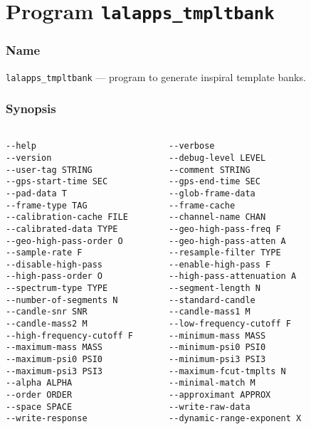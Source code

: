 \section{Program \texttt{lalapps\_tmpltbank}}
\label{program:lalapps-tmpltbank}

\subsubsection{Name}
\begin{entry}
\noindent\verb$lalapps_tmpltbank$ --- program to generate inspiral template banks.

\subsubsection{Synopsis}
\begin{verbatim}

--help                          --verbose                   
--version                       --debug-level LEVEL      
--user-tag STRING               --comment STRING       
--gps-start-time SEC            --gps-end-time SEC  
--pad-data T                    --glob-frame-data         
--frame-type TAG                --frame-cache          
--calibration-cache FILE        --channel-name CHAN          
--calibrated-data TYPE          --geo-high-pass-freq F   
--geo-high-pass-order O         --geo-high-pass-atten A  
--sample-rate F                 --resample-filter TYPE      	
--disable-high-pass             --enable-high-pass F         
--high-pass-order O             --high-pass-attenuation A   
--spectrum-type TYPE            --segment-length N      
--number-of-segments N          --standard-candle           
--candle-snr SNR                --candle-mass1 M             
--candle-mass2 M                --low-frequency-cutoff F     
--high-frequency-cutoff F       --minimum-mass MASS        
--maximum-mass MASS             --minimum-psi0 PSI0          
--maximum-psi0 PSI0             --minimum-psi3 PSI3          
--maximum-psi3 PSI3             --maximum-fcut-tmplts N    
--alpha ALPHA                   --minimal-match M       
--order ORDER                   --approximant APPROX          
--space SPACE                   --write-raw-data           
--write-response                --dynamic-range-exponent X  

\end{verbatim}
\end{entry}

